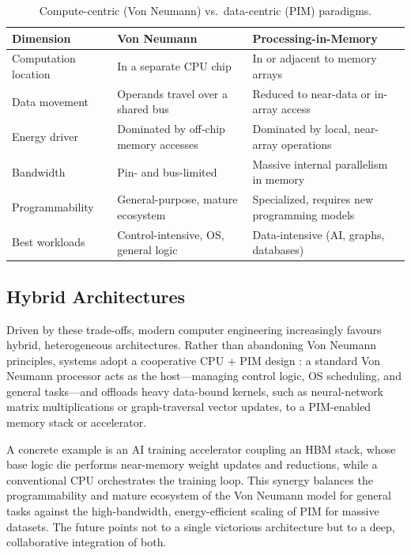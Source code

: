 \documentclass{article} %
\begin{document}
\begin{table}[t]
\caption{Compute-centric (Von Neumann) vs.\ data-centric (PIM) paradigms.}
\label{tab:compare}
\begin{center}
\begin{tabular}{lll}
\toprule
\textbf{Dimension} & \textbf{Von Neumann} & \textbf{Processing-in-Memory} \\
\midrule
Computation location & In a separate CPU chip & In or adjacent to memory arrays \\
Data movement        & Operands travel over a shared bus & Reduced to near-data or in-array access \\
Energy driver        & Dominated by off-chip memory accesses & Dominated by local, near-array operations \\
Bandwidth            & Pin- and bus-limited & Massive internal parallelism in memory \\
Programmability      & General-purpose, mature ecosystem & Specialized, requires new programming models \\
Best workloads       & Control-intensive, OS, general logic & Data-intensive (AI, graphs, databases) \\
\bottomrule
\end{tabular}
\end{center}
\end{table}

\subsection{Hybrid Architectures}

Driven by these trade-offs, modern computer engineering increasingly favours hybrid, heterogeneous architectures. Rather than abandoning Von Neumann principles, systems adopt a cooperative CPU + PIM design \citep{mutlu2021primer}: a standard Von Neumann processor acts as the host---managing control logic, OS scheduling, and general tasks---and offloads heavy data-bound kernels, such as neural-network matrix multiplications or graph-traversal vector updates, to a PIM-enabled memory stack or accelerator.

A concrete example is an AI training accelerator coupling an HBM stack, whose base logic die performs near-memory weight updates and reductions, while a conventional CPU orchestrates the training loop. This synergy balances the programmability and mature ecosystem of the Von Neumann model for general tasks against the high-bandwidth, energy-efficient scaling of PIM for massive datasets. The future points not to a single victorious architecture but to a deep, collaborative integration of both.
\end{document}
